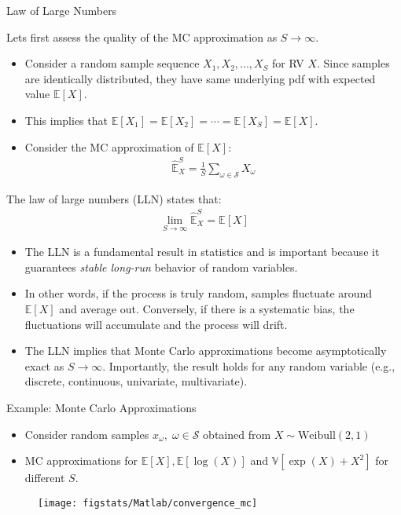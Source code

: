 \documentclass[9pt]{beamer}
\begin{document}
%
\begin{frame}{Law of Large Numbers}

Lets first assess the quality of the MC approximation as $S\to \infty$. 
\begin{itemize}
\item Consider a random sample sequence $X_1,X_2,...,X_S$ for RV $X$. Since samples are identically distributed, they have same underlying pdf with expected value $\mathbb{E}[X]$. 
\item This implies that $\mathbb{E}[X_1]=\mathbb{E}[X_2]=\cdots=\mathbb{E}[X_S]=\mathbb{E}[X]$. 
\item Consider the MC approximation of $\mathbb{E}[X]$:
\begin{align*}
\hat{\mathbb{E}}_X^S=\frac{1}{S}\sum_{\omega \in \mathcal{S}}X_\omega
\end{align*}
\end{itemize}
\begin{block}{}
The law of large numbers (LLN) states that:
\begin{align*}
\lim_{S\to \infty}\hat{\mathbb{E}}_X^S=\mathbb{E}[X]
\end{align*}
\end{block}
\begin{itemize}
\item The LLN is a fundamental result in statistics and is important because it guarantees {\em stable long-run} behavior of random variables.  

\item In other words, if the process is truly random, samples fluctuate around $\mathbb{E}[X]$ and average out.  Conversely, if there is a systematic bias, the fluctuations will accumulate and the process will drift. 

\item The LLN implies that Monte Carlo approximations become asymptotically exact as $S\to \infty$. Importantly, the result holds for any random variable (e.g., discrete, continuous, univariate, multivariate). 
\end{itemize}

\end{frame}

%
\begin{frame}{Example: Monte Carlo Approximations}

\begin{itemize}
\item Consider random samples $x_\omega,\; \omega \in \mathcal{S}$ obtained from $X\sim \textrm{Weibull}(2,1)$
\item MC approximations for $\mathbb{E}[X],\mathbb{E}[\log(X)]$ and $\mathbb{V}[\exp(X)+X^2]$  for different $S$.
\end{itemize}
\begin{figure}[!htb]
    \centering
	\texttt{[image: figstats/Matlab/convergence\_mc]}
\end{figure}


\end{frame}
\end{document}
